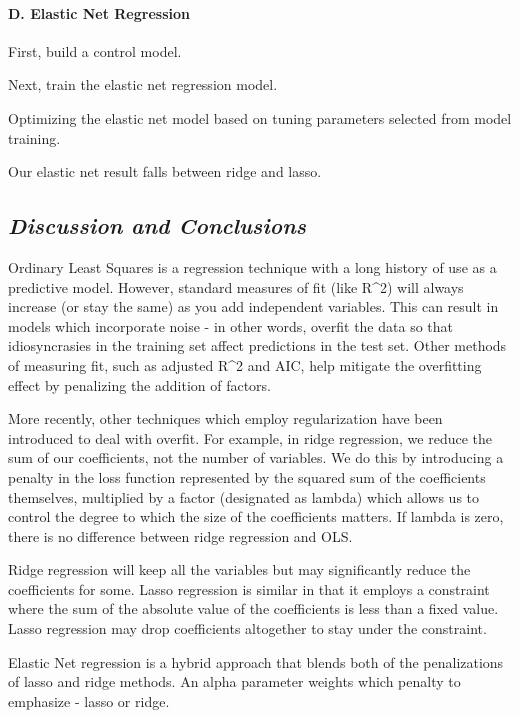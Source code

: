 \documentclass[
]{article}
\begin{document}
\hypertarget{d.-elastic-net-regression}{%
\paragraph{D. Elastic Net Regression}\label{d.-elastic-net-regression}}

First, build a control model.

Next, train the elastic net regression model.

Optimizing the elastic net model based on tuning parameters selected
from model training.

Our elastic net result falls between ridge and lasso.

\hypertarget{discussion-and-conclusions}{%
\subsection{\texorpdfstring{\emph{Discussion and
Conclusions}}{Discussion and Conclusions}}\label{discussion-and-conclusions}}

Ordinary Least Squares is a regression technique with a long history of
use as a predictive model. However, standard measures of fit (like
R\^{}2) will always increase (or stay the same) as you add independent
variables. This can result in models which incorporate noise - in other
words, overfit the data so that idiosyncrasies in the training set
affect predictions in the test set. Other methods of measuring fit, such
as adjusted R\^{}2 and AIC, help mitigate the overfitting effect by
penalizing the addition of factors.

More recently, other techniques which employ regularization have been
introduced to deal with overfit. For example, in ridge regression, we
reduce the sum of our coefficients, not the number of variables. We do
this by introducing a penalty in the loss function represented by the
squared sum of the coefficients themselves, multiplied by a factor
(designated as lambda) which allows us to control the degree to which
the size of the coefficients matters. If lambda is zero, there is no
difference between ridge regression and OLS.

Ridge regression will keep all the variables but may significantly
reduce the coefficients for some. Lasso regression is similar in that it
employs a constraint where the sum of the absolute value of the
coefficients is less than a fixed value. Lasso regression may drop
coefficients altogether to stay under the constraint.

Elastic Net regression is a hybrid approach that blends both of the
penalizations of lasso and ridge methods. An alpha parameter weights
which penalty to emphasize - lasso or ridge.
\end{document}
